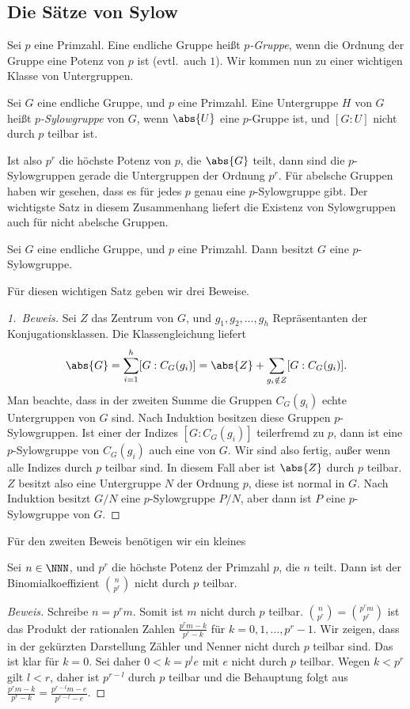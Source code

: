\documentclass[12pt,a4paper,twoside]{article}
\newcommand{\ei}[1]{\emph{#1}\index{#1}}
\begin{document}
\subsection{Die S\"atze von Sylow}
Sei $p$ eine Primzahl. Eine endliche Gruppe hei\ss t \ei{$p$-Gruppe}, wenn die
Ordnung der Gruppe eine Potenz von $p$ ist (evtl.\ auch $1$). Wir kommen nun
zu einer wichtigen Klasse von Untergruppen.
\begin{Definition}
  Sei $G$ eine endliche Gruppe, und $p$ eine Primzahl. Eine Untergruppe $H$
  von $G$ hei\ss t \ei{$p$-Sylowgruppe} von $G$, wenn $\abs{U}$ eine
  $p$-Gruppe ist, und $[G:U]$ nicht durch $p$ teilbar ist.
\end{Definition}
Ist also $p^r$ die h\"ochste Potenz von $p$, die $\abs{G}$ teilt, dann sind
die $p$-Sylowgruppen gerade die Untergruppen der Ordnung $p^r$. F\"ur abelsche
Gruppen haben wir gesehen, dass es f\"ur jedes $p$ genau eine $p$-Sylowgruppe
gibt. Der wichtigste Satz in diesem Zusammenhang liefert die Existenz von
Sylowgruppen auch f\"ur nicht abelsche Gruppen.
\begin{Satz}[Sylow]\label{S:Sylow}
  Sei $G$ eine endliche Gruppe, und $p$ eine Primzahl. Dann besitzt $G$ eine
  $p$-Sylowgruppe.
\end{Satz}
F\"ur diesen wichtigen Satz geben wir drei Beweise.
\begin{proof}[1.\ Beweis]
  Sei $Z$ das Zentrum von $G$, und $g_1,g_2,\dots,g_h$ Repr\"asentanten der
  Konjugationsklassen. Die Klassengleichung liefert
\[
\abs{G}=\sum_{i=1}^h[G:C_G(g_i)]=\abs{Z}+\sum_{g_i\notin Z}[G:C_G(g_i)].
\]
Man beachte, dass in der zweiten Summe die Gruppen $C_G(g_i)$ echte
Untergruppen von $G$ sind. Nach Induktion besitzen diese Gruppen
$p$-Sylowgruppen. Ist einer der Indizes $[G:C_G(g_i)]$ teilerfremd zu $p$,
dann ist eine $p$-Sylowgruppe von $C_G(g_i)$ auch eine von $G$. Wir sind also
fertig, au\ss er wenn alle Indizes durch $p$ teilbar sind. In diesem Fall aber
ist $\abs{Z}$ durch $p$ teilbar. $Z$ besitzt also eine Untergruppe $N$ der
Ordnung $p$, diese ist normal in $G$. Nach Induktion besitzt $G/N$ eine
$p$-Sylowgruppe $P/N$, aber dann ist $P$ eine $p$-Sylowgruppe von $G$.
\end{proof}
F\"ur den zweiten Beweis ben\"otigen wir ein kleines
\begin{Lemma}
  Sei $n\in\NNN$, und $p^r$ die h\"ochste Potenz der Primzahl $p$, die $n$
  teilt. Dann ist der Binomialkoeffizient $\binom{n}{p^r}$ nicht durch $p$
  teilbar.
\end{Lemma}
\begin{proof}[Beweis]
  Schreibe $n=p^rm$. Somit ist $m$ nicht durch $p$ teilbar.
  $\binom{n}{p^r}=\binom{p^rm}{p^r}$ ist das Produkt der rationalen Zahlen
  $\frac{p^rm-k}{p^r-k}$ f\"ur $k=0,1,\dots,p^r-1$. Wir zeigen, dass in der
  gek\"urzten Darstellung Z\"ahler und Nenner nicht durch $p$ teilbar sind.
  Das ist klar f\"ur $k=0$. Sei daher $0<k=p^le$ mit $e$ nicht durch $p$
  teilbar. Wegen $k<p^r$ gilt $l<r$, daher ist $p^{r-l}$ durch $p$ teilbar und
  die Behauptung folgt aus
  $\frac{p^rm-k}{p^r-k}=\frac{p^{r-l}m-e}{p^{r-l}-e}$.
\end{proof}
\end{document}
